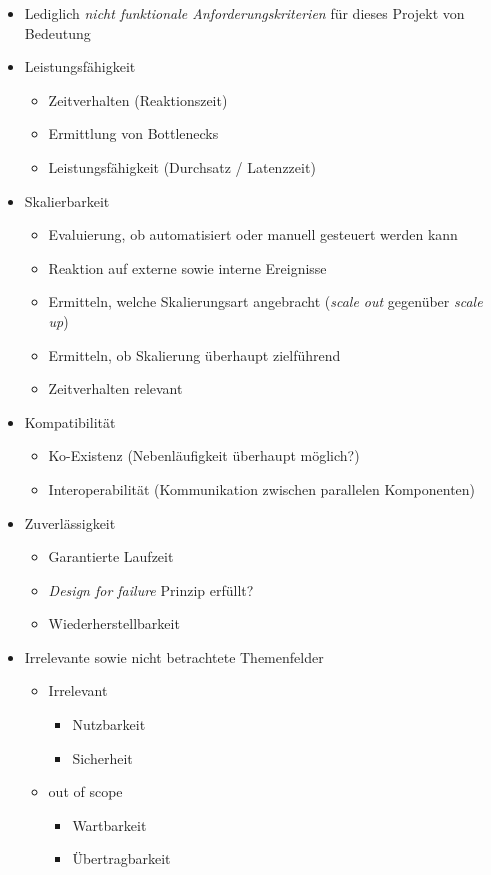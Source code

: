 \begin{itemize}
	\item Lediglich \emph{nicht funktionale Anforderungskriterien} für dieses Projekt von Bedeutung
	\item Leistungsfähigkeit
	\begin{itemize}
		\item Zeitverhalten (Reaktionszeit)
		\item Ermittlung von Bottlenecks
		\item Leistungsfähigkeit (Durchsatz / Latenzzeit)
	\end{itemize}
	\item Skalierbarkeit
	\begin{itemize}
		\item Evaluierung, ob automatisiert oder manuell gesteuert werden kann
		\item Reaktion auf externe sowie interne Ereignisse
		\item Ermitteln, welche Skalierungsart angebracht (\emph{scale out} gegenüber \emph{scale up})
		\item Ermitteln, ob Skalierung überhaupt zielführend
		\item Zeitverhalten relevant
	\end{itemize}
	\item Kompatibilität
	\begin{itemize}
		\item Ko-Existenz (Nebenläufigkeit überhaupt möglich?)
		\item Interoperabilität (Kommunikation zwischen parallelen Komponenten)
	\end{itemize}
	\item Zuverlässigkeit
	\begin{itemize}
		\item Garantierte Laufzeit
		\item \emph{Design for failure} Prinzip erfüllt?
		\item Wiederherstellbarkeit
	\end{itemize}
	\item Irrelevante sowie nicht betrachtete Themenfelder
	\begin{itemize}
		\item Irrelevant
		\begin{itemize}
			\item Nutzbarkeit
			\item Sicherheit
		\end{itemize}
		\item out of scope
		\begin{itemize}
			\item Wartbarkeit
			\item Übertragbarkeit
		\end{itemize}
	\end{itemize}
\end{itemize}
